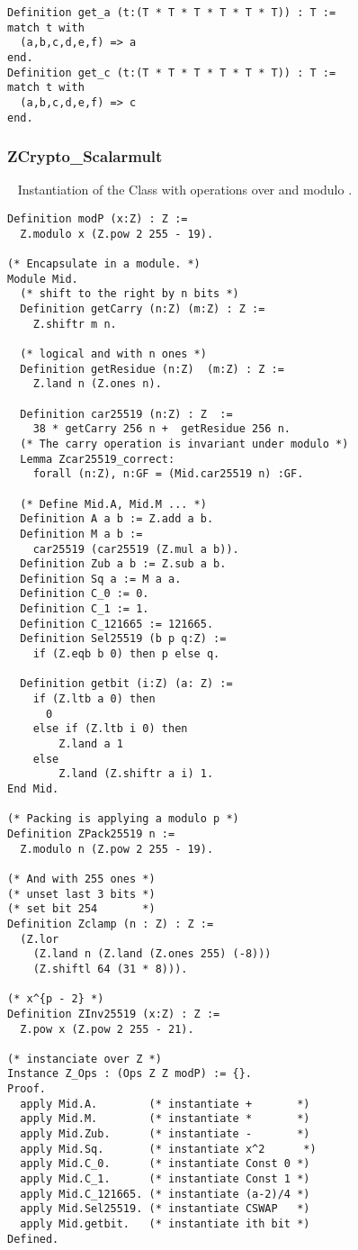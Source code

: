 \begin{lstlisting}[language=Coq]
Definition get_a (t:(T * T * T * T * T * T)) : T :=
match t with
  (a,b,c,d,e,f) => a
end.
Definition get_c (t:(T * T * T * T * T * T)) : T :=
match t with
  (a,b,c,d,e,f) => c
end.
\end{lstlisting}

\subsubsection{ZCrypto\_Scalarmult}
\label{subsubsec:ZCryptoScalarmult}
~
Instantiation of the Class  with operations over \Z and modulo \p.
\begin{lstlisting}[language=Coq]
Definition modP (x:Z) : Z :=
  Z.modulo x (Z.pow 2 255 - 19).

(* Encapsulate in a module. *)
Module Mid.
  (* shift to the right by n bits *)
  Definition getCarry (n:Z) (m:Z) : Z :=
    Z.shiftr m n.

  (* logical and with n ones *)
  Definition getResidue (n:Z)  (m:Z) : Z :=
    Z.land n (Z.ones n).

  Definition car25519 (n:Z) : Z  :=
    38 * getCarry 256 n +  getResidue 256 n.
  (* The carry operation is invariant under modulo *)
  Lemma Zcar25519_correct:
    forall (n:Z), n:GF = (Mid.car25519 n) :GF.

  (* Define Mid.A, Mid.M ... *)
  Definition A a b := Z.add a b.
  Definition M a b :=
    car25519 (car25519 (Z.mul a b)).
  Definition Zub a b := Z.sub a b.
  Definition Sq a := M a a.
  Definition C_0 := 0.
  Definition C_1 := 1.
  Definition C_121665 := 121665.
  Definition Sel25519 (b p q:Z) :=
    if (Z.eqb b 0) then p else q.

  Definition getbit (i:Z) (a: Z) :=
    if (Z.ltb a 0) then
      0
    else if (Z.ltb i 0) then
        Z.land a 1
    else
        Z.land (Z.shiftr a i) 1.
End Mid.

(* Packing is applying a modulo p *)
Definition ZPack25519 n :=
  Z.modulo n (Z.pow 2 255 - 19).

(* And with 255 ones *)
(* unset last 3 bits *)
(* set bit 254       *)
Definition Zclamp (n : Z) : Z :=
  (Z.lor
    (Z.land n (Z.land (Z.ones 255) (-8)))
    (Z.shiftl 64 (31 * 8))).

(* x^{p - 2} *)
Definition ZInv25519 (x:Z) : Z :=
  Z.pow x (Z.pow 2 255 - 21).

(* instanciate over Z *)
Instance Z_Ops : (Ops Z Z modP) := {}.
Proof.
  apply Mid.A.        (* instantiate +       *)
  apply Mid.M.        (* instantiate *       *)
  apply Mid.Zub.      (* instantiate -       *)
  apply Mid.Sq.       (* instantiate x^2      *)
  apply Mid.C_0.      (* instantiate Const 0 *)
  apply Mid.C_1.      (* instantiate Const 1 *)
  apply Mid.C_121665. (* instantiate (a-2)/4 *)
  apply Mid.Sel25519. (* instantiate CSWAP   *)
  apply Mid.getbit.   (* instantiate ith bit *)
Defined.


\end{lstlisting}
